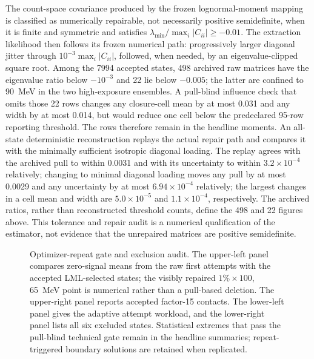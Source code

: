 The count-space covariance produced by the frozen lognormal-moment mapping is
classified as numerically repairable, not necessarily positive semidefinite, when it
is finite and symmetric and satisfies
$\lambda_{\min}/\max_i|C_{ii}|\geq-0.01$.  The extraction likelihood then follows its
frozen numerical path: progressively larger diagonal jitter through
$10^{-3}\max_i|C_{ii}|$, followed, when needed, by an eigenvalue-clipped square root.
Among the 7994 accepted states, 498 archived raw matrices have the eigenvalue ratio
below $-10^{-3}$ and 22 lie below $-0.005$; the latter are confined to 90~MeV in the
two high-exposure ensembles.  A pull-blind influence check that omits those 22 rows
changes any closure-cell mean by at most 0.031 and any width by at most 0.014, but
would reduce one cell below the predeclared 95-row reporting threshold.  The rows
therefore remain in the headline moments.  An all-state deterministic reconstruction
replays the actual repair path and compares it with the minimally sufficient isotropic
diagonal loading.  The replay agrees with the archived pull to within 0.0031 and with
its uncertainty to within $3.2\times10^{-4}$ relatively; changing to minimal diagonal
loading moves any pull by at most 0.0029 and any uncertainty by at most
$6.94\times10^{-4}$ relatively; the largest changes in a cell mean and width are
$5.0\times10^{-5}$ and $1.1\times10^{-4}$, respectively.  The archived ratios, rather than reconstructed
threshold counts, define the 498 and 22 figures above.  This tolerance and repair audit is a
numerical qualification of the estimator, not evidence that the unrepaired matrices
are positive semidefinite.

\begin{figure}[p]
\centering
{}
\caption{Optimizer-repeat gate and exclusion audit.  The upper-left panel compares
zero-signal means from the raw first attempts with the accepted LML-selected states;
the visibly repaired $1\%\times100$, 65~MeV point is numerical rather than a pull-based
deletion.  The upper-right panel reports accepted factor-15 contacts.  The lower-left
panel gives the adaptive attempt workload, and the lower-right panel lists all six
excluded states.  Statistical extremes that pass the pull-blind technical gate remain
in the headline summaries; repeat-triggered boundary solutions are retained when
replicated.}
\label{fig:v501-v4p6-optimizer-gate}
\end{figure}

